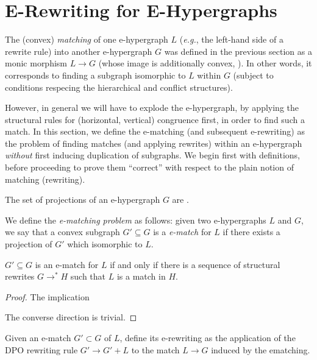 
\section{E-Rewriting for E-Hypergraphs}

The (convex) \textit{matching} of one e-hypergraph $L$ (\textit{e.g.}, the left-hand side of a rewrite rule) into another e-hypergraph $G$ was defined in the previous section as a monic morphism $L \to G$ (whose image is additionally convex, ). In other words, it corresponds to finding a subgraph isomorphic to $L$ within $G$ (subject to conditions respecing the hierarchical and conflict structures). 


However, in general we will have to explode the e-hypergraph, by applying the structural rules for (horizontal, vertical) congruence first, in order to find such a match. In this section, we define the  e-matching (and subsequent e-rewriting) as the problem of finding matches (and applying rewrites) within an e-hypergraph \textit{without} first inducing duplication of subgraphs. We begin first with definitions, before proceeding to prove them “correct” with respect to the plain notion of matching (rewriting). 

\begin{definition}[Projection]
The set of projections of an e-hypergraph $G$ are .    
\end{definition}

\begin{definition}[E-matching]
We define the \textit{e-matching problem} as follows: given two e-hypergraphs  $L$ and $G$, we say that a convex subgraph $G' \subseteq G$ is a \textit{e-match} for $L$ if there exists a projection of $G'$ which isomorphic to $L$.
\end{definition}

\begin{lemma}
$G' \subseteq G$ is an e-match for $L$ if and only if there is a sequence of structural rewrites $G \to^* H$ such that $L$ is a match in $H$.
\end{lemma}
\begin{proof}
The implication

The converse direction is trivial. 
\end{proof}

\begin{definition}[E-matching]
Given an e-match $G' \subset G$ of $L$, 
define its e-rewriting as the application of the DPO rewriting rule $G' \to G' + L$  to the match $L \to G$ induced by the ematching. 
\end{definition}

